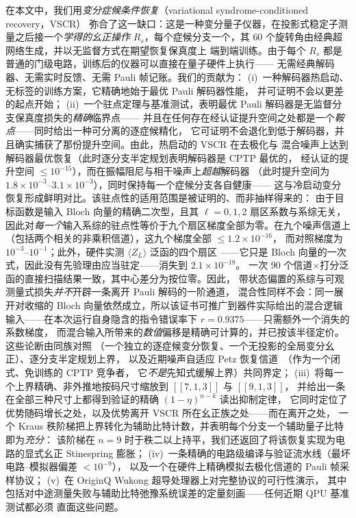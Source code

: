 \documentclass[11pt,a4paper]{article}
\begin{document}
在本文中，我们用\emph{变分症候条件恢复}（variational syndrome-conditioned recovery，VSCR）
弥合了这一缺口：这是一种变分量子仪器，在投影式稳定子测量之后接一个\emph{学得的幺正操作}
$R_s$，每个症候分支一个，其 $60$ 个旋转角由经典超网络生成，并以无监督方式在期望恢复保真度上
端到端训练。由于每个 $R_s$ 都是普通的门级电路，训练后的仪器可以直接在量子硬件上执行——
无需经典解码器、无需实时反馈、无需 Pauli 帧记账。我们的贡献为：
(i)~一种解码器热启动、无标签的训练方案，它精确地始于最优 Pauli 解码器性能，
并可证明不会以更差的起点开始；
(ii)~一个驻点定理与基准测试，表明最优 Pauli 解码器是无监督分支保真度损失的\emph{精确}临界点——
并且在任何存在经认证提升空间之处都是一个\emph{鞍点}——同时给出一种可分离的逐症候精化，
它可证明不会退化到低于解码器，并且确实捕获了那份提升空间。由此，热启动的 VSCR 在去极化与
混合噪声上达到解码器最优恢复（此时逐分支半定规划表明解码器是 CPTP 最优的，
经认证的提升空间 $\le10^{-15}$），而在振幅阻尼与相干噪声上\emph{超越}解码器
（此时提升空间为 $1.8\times10^{-3}$--$3.1\times10^{-3}$），同时保持每一个症候分支各自健康——
这与冷启动变分恢复形成鲜明对比。该驻点性的适用范围是被证明的、而非抽样得来的：
由于目标函数是输入 Bloch 向量的精确二次型，且其 $\ell=0,1,2$ 扇区系数与系综无关，
因此对\emph{每一个}输入系综的驻点性等价于九个扇区梯度全部为零。在九个噪声信道上
（包括两个相关的非乘积信道），这九个梯度全部 $\le1.2\times10^{-16}$，
而对照梯度为 $10^{-3}$--$10^{-1}$；此外，硬件实测 $\langle Z_L\rangle$ 泛函的四个扇区
——它只是 Bloch 向量的一次式，因此没有先验理由应当驻定——消失到 $2.1\times10^{-18}$。
一次 $90$ 个信道$\times$打分泛函的直接扫描结果一致，其中心差分为按位零。因此，
带状态偏置的系综与可观测量式损失\emph{并不}开辟一条离开 Pauli 解码的一阶通道，
混合性同样不会：同一展开对收缩的 Bloch 向量依然成立，所以该证书可推广到器件实际给出的混合逻辑
输入——在本次运行自身隐含的指令错误率下 $r=0.9375$——只需额外一个消失的系数梯度，
而混合输入所带来的\emph{数值}偏移是精确可计算的，并已按该半径定价。这些论断由同族对照
（一个独立的逐症候变分恢复、一个无投影的全局变分幺正）、逐分支半定规划上界，
以及近期噪声自适应 Petz 恢复信道~\cite{biswas_petz}（作为一个闭式、免训练的 CPTP 竞争者，
它\emph{不是}先知式缓解上界）共同界定；
(iii)~将每一个上界精确、非外推地按码尺寸缩放到 $[\![7,1,3]\!]$ 与 $[\![9,1,3]\!]$，
并给出一条在全部三种尺寸上都得到验证的精确 $(1-\eta)^{n-k}$ 读出抑制定律，
它同时定位了优势随码增长之处，以及优势离开 VSCR 所在幺正族之处——而在离开之处，
一个 Kraus 秩阶梯把上界转化为辅助比特计数，并表明每个分支一个辅助量子比特即为\emph{充分}：
该阶梯在 $n=9$ 时于秩二以上持平，我们还返回了将该恢复实现为电路的显式幺正 Stinespring 膨胀；
(iv)~一条精确的电路级编译与验证流水线（最坏电路--模拟器偏差 $<10^{-9}$），
以及一个在硬件上精确模拟去极化信道的 Pauli 帧采样协议；
(v)~在 OriginQ Wukong 超导处理器上对完整协议的可行性演示，
其中包括对中途测量失败与辅助比特弛豫系统误差的定量刻画——任何近期 QPU 基准测试都必须
直面这些问题。
\end{document}
